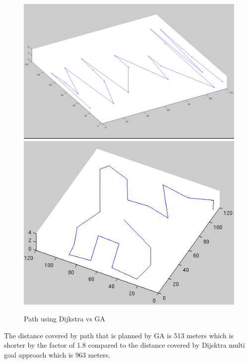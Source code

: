 \begin{figure}[!htb]
  \includegraphics[width=\linewidth]{figures/DijkstraPath2.png}  
  \endminipage\hfill
   \includegraphics[width=\linewidth]{figures/Path_planned_G.png}
  \caption{Path using Dijkstra vs GA}
  \label{fig:Path_planning}
  
  \endminipage 
\end{figure}


The distance covered by path that is planned by GA is 513 meters which is shorter by the factor of 1.8 compared to the distance covered by Dijsktra multi goal approach which is 963 meters.

